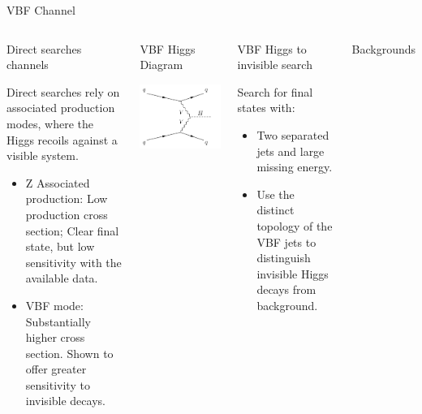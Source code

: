 \documentclass[8pt]{beamer}
\begin{document}
\begin{frame}{VBF Channel}

\begin{columns}
 
\begin{block}{Direct searches channels}

Direct searches rely on associated production modes, where the Higgs recoils against a visible system.
\begin{itemize}
 \item Z Associated production: Low production cross section; Clear final state, but low sensitivity with the available data.
 \item VBF mode: Substantially higher cross section. Shown to offer greater sensitivity to invisible decays.
\end{itemize}

\end{block}

\begin{block}{VBF Higgs Diagram}
 
\centering
\includegraphics[width=0.45\linewidth]{img/feyn_VBF.pdf} 

\end{block}

\begin{block}{VBF Higgs to invisible search}

Search for final states with:
\begin{itemize}
 \item Two separated jets and large missing energy.
 \item Use the distinct topology of the VBF jets to distinguish invisible Higgs decays from background.
\end{itemize}
 
\end{block}

\begin{block}{Backgrounds}


\end{block}
\end{columns}
\end{frame}
\end{document}

